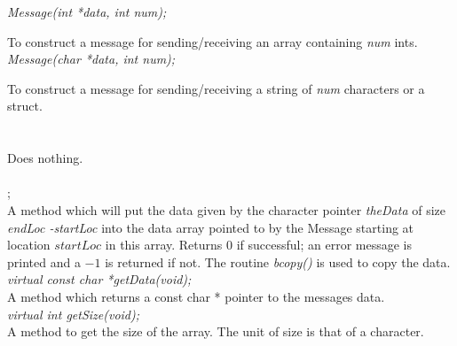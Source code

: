 {\em Message(int *data, int num);}

To construct a message for sending/receiving an array containing {\em
num} ints. \\

{\em Message(char *data, int num);} 

To construct a message for sending/receiving a string of {\em num}
characters or a struct. \\ 

 \\
\\ 
Does nothing. \\

  \\
; \\ 
A method which will put the data given by the character pointer {\em
theData} of size {\em endLoc -startLoc} into the data array pointed to
by the Message starting at location $startLoc$ in this array. Returns $0$ if
successful; an error message is printed and a $-1$ is returned if
not. The routine {\em bcopy()} is used to copy the data. \\ 

{\em  virtual const char *getData(void);}\\
A method which returns a const char * pointer to the messages data. \\

{\em  virtual int   getSize(void);} \\
A method to get the size of the array. The unit of size is that of a
character. 

